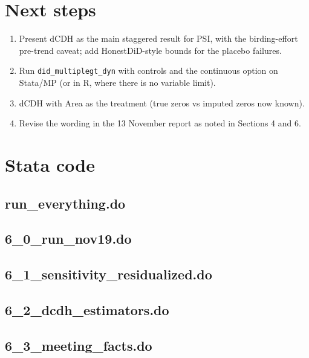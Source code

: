 \documentclass[11pt]{article}
\begin{document}
\section{Next steps}
\begin{enumerate}[leftmargin=18pt,itemsep=1pt]
\item Present dCDH as the main staggered result for PSI, with the birding-effort pre-trend caveat; add HonestDiD-style bounds for the placebo failures.
\item Run \texttt{did\_multiplegt\_dyn} with controls and the continuous option on Stata/MP (or in R, where there is no variable limit).
\item dCDH with Area as the treatment (true zeros vs imputed zeros now known).
\item Revise the wording in the 13 November report as noted in Sections 4 and 6.
\end{enumerate}

\appendix
\section{Stata code}
\subsection{run\_everything.do}
\subsection{6\_0\_run\_nov19.do}
\subsection{6\_1\_sensitivity\_residualized.do}
\subsection{6\_2\_dcdh\_estimators.do}
\subsection{6\_3\_meeting\_facts.do}
\end{document}
